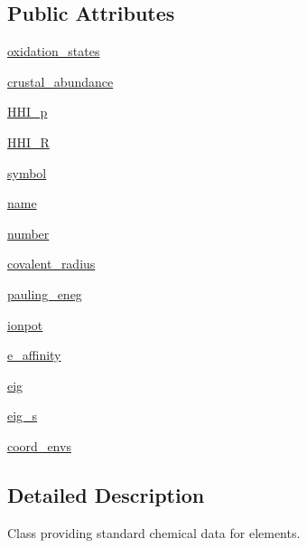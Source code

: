 \subsection*{Public Attributes}
\begin{DoxyCompactItemize}
\item 
\hyperlink{classsmact_1_1core_1_1_element_a48bcda32c64f4b012bb81d5e52b065eb}{oxidation\+\_\+states}
\item 
\hyperlink{classsmact_1_1core_1_1_element_a6a1fb78c04a5d4c60dec746d7a7dd40d}{crustal\+\_\+abundance}
\item 
\hyperlink{classsmact_1_1core_1_1_element_a5f031a6efa10491fd6380613462d96a3}{H\+H\+I\+\_\+p}
\item 
\hyperlink{classsmact_1_1core_1_1_element_a197c7ae8d71c349431538d4458c0c1d7}{H\+H\+I\+\_\+\+R}
\item 
\hyperlink{classsmact_1_1core_1_1_element_a6d08136e1d0c72c81fc84819df2dd445}{symbol}
\item 
\hyperlink{classsmact_1_1core_1_1_element_a89e5ff959b6f096dc9285694d5ab22bd}{name}
\item 
\hyperlink{classsmact_1_1core_1_1_element_a4504f14ceab60eab6bb661a10a9314a5}{number}
\item 
\hyperlink{classsmact_1_1core_1_1_element_a9df0fe14367b21ea290b4b1176161aaf}{covalent\+\_\+radius}
\item 
\hyperlink{classsmact_1_1core_1_1_element_a9d9694ce9663754858c0f8218251628e}{pauling\+\_\+eneg}
\item 
\hyperlink{classsmact_1_1core_1_1_element_ae2ae96c550dc0eec1cb5d9a382ac234f}{ionpot}
\item 
\hyperlink{classsmact_1_1core_1_1_element_af43f90f8073aa781d8b9ba78668aa555}{e\+\_\+affinity}
\item 
\hyperlink{classsmact_1_1core_1_1_element_aa91683b81bb28c62f822b730902fe143}{eig}
\item 
\hyperlink{classsmact_1_1core_1_1_element_a44f7d5b4878a683b060ae821f55a48e8}{eig\+\_\+s}
\item 
\hyperlink{classsmact_1_1core_1_1_element_af8f4048bac5979e89864cdfdade6db76}{coord\+\_\+envs}
\end{DoxyCompactItemize}


\subsection{Detailed Description}
\begin{DoxyVerb}Class providing standard chemical data for elements.\end{DoxyVerb}
 

